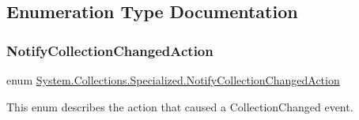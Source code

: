 \subsection{Enumeration Type Documentation}
\mbox{\label{namespace_system_1_1_collections_1_1_specialized_a7e21ea761562ed22011c3120bbb31123}} 
\subsubsection{\texorpdfstring{Notify\+Collection\+Changed\+Action}{NotifyCollectionChangedAction}}
{\footnotesize\ttfamily enum \hyperlink{namespace_system_1_1_collections_1_1_specialized_a7e21ea761562ed22011c3120bbb31123}{System.\+Collections.\+Specialized.\+Notify\+Collection\+Changed\+Action}\hspace{0.3cm}{\ttfamily [strong]}}



This enum describes the action that caused a Collection\+Changed event. 

